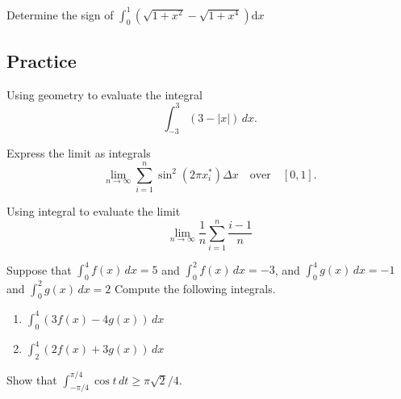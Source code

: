 \begin{example}

Determine the sign of
\(\int_0^1(\sqrt{1+x^2}-\sqrt{1+x^4})\mathrm{d} x\)

\end{example}
\vspace*{6\baselineskip}

\subsection{Practice}

\begin{exercise}

Using geometry to evaluate the integral
\[\displaystyle \int^3_{-3}(3 - |x|)\,dx.\]

\end{exercise}
\vspace*{6\baselineskip}

\begin{exercise}

Express the limit as integrals
\[\displaystyle \lim_{n\to\infty}\sum_{i=1}^n\sin^2(2\pi x^*_i)\Delta x\quad \text{over}\quad [0,1].\]

\end{exercise}
\vspace*{6\baselineskip}

\begin{exercise}

Using integral to evaluate the limit
\[\displaystyle \lim\limits_{n\to \infty}\frac{1}{n}\sum_{i=1}^n\frac{i - 1}{n}\]

\end{exercise}
\vspace*{6\baselineskip}

\begin{exercise}

Suppose that \(\displaystyle \int^4_0f(x)\,dx=5\) and
\(\displaystyle \int^2_0f(x)\,dx= - 3\), and
\(\displaystyle \int^4_0g(x)\,dx= - 1\) and
\(\displaystyle \int^2_0g(x)\,dx=2\) Compute the following integrals.

\begin{enumerate}
\item
  \(\displaystyle \int^4_0(3f(x) - 4g(x))\,dx\)
\item
  \(\displaystyle \int^4_2(2f(x)+3g(x))\,dx\)
\end{enumerate}

\end{exercise}

\begin{exercise}

Show that
\(\displaystyle \int^{\pi/4}_{ - \pi/4}\cos t\,dt \ge \pi\sqrt{2}/4\).

\end{exercise}

